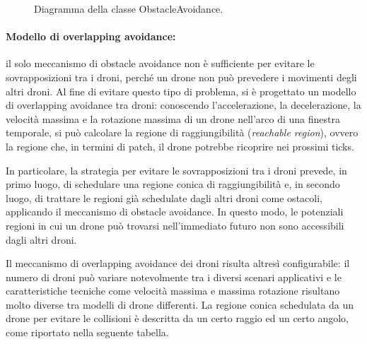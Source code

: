 \begin{figure}[H] 
    \captionsetup{justification=centering, margin=2cm, font=footnotesize}
    \begin{center}
    \end{center}
    \caption{Diagramma della classe ObstacleAvoidance.}
    \label{classe_obstacle}
\end{figure}

\paragraph{Modello di overlapping avoidance:} il solo meccanismo di obstacle avoidance non è sufficiente per evitare le sovrapposizioni tra i droni, perché un drone non può prevedere i movimenti degli altri droni. 
Al fine di evitare questo tipo di problema, si è progettato un modello di overlapping avoidance tra droni: conoscendo l’accelerazione, la decelerazione, la velocità massima e la rotazione massima di un drone nell’arco di una finestra temporale, si può calcolare la regione di raggiungibilità (\textit{reachable region}), ovvero la regione che, in termini di patch, il drone potrebbe ricoprire nei prossimi ticks. 

In particolare, la strategia per evitare le sovrapposizioni tra i droni prevede, in primo luogo, di schedulare una regione conica di raggiungibilità e, in secondo luogo, di trattare le regioni già schedulate dagli altri droni come ostacoli, applicando il meccanismo di obstacle avoidance. 
In questo modo, le potenziali regioni in cui un drone può trovarsi nell’immediato futuro non sono accessibili dagli altri droni. 

Il meccanismo di overlapping avoidance dei droni risulta altresì configurabile: il numero di droni può variare notevolmente tra i diversi scenari applicativi e le caratteristiche tecniche come velocità massima e massima rotazione risultano molto diverse tra modelli di drone differenti. 
La regione conica schedulata da un drone per evitare le collisioni è descritta da un certo raggio ed un certo angolo, come riportato nella seguente tabella.

